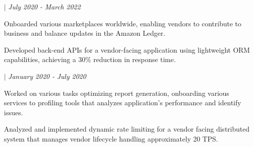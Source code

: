     \hspace{17pt}  $|$ \textit{July 2020 - March 2022 }
    \experienceItemListStart
        \item  Onboarded various marketplaces worldwide, enabling vendors to contribute to business and balance updates in the Amazon Ledger.  
        \item  Developed back-end APIs for a vendor-facing application using lightweight ORM capabilities, achieving a 30\% reduction in response time.  
    \experienceItemListEnd

    \hspace{17pt}  $|$ \textit{January 2020 - July 2020}
    \experienceItemListStart
        \item  Worked on various tasks optimizing report generation, onboarding various services to profiling tools that analyzes application's performance and identify issues.
        \item  Analyzed and implemented dynamic rate limiting for a vendor facing distributed system that manages vendor lifecycle handling approximately 20 TPS. 
    \experienceItemListEnd

